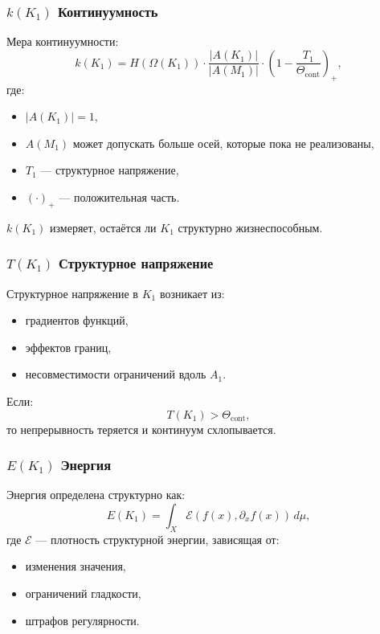 \subsubsection{\texorpdfstring{$k(K_1)$}{k(K_1)} Континуумность}

Мера континуумности:
\[
k(K_1) =
H(\Omega(K_1)) \cdot
\frac{|A(K_1)|}{|A(M_1)|} \cdot
(1 - \frac{T_1}{\Theta_{\mathrm{cont}}})_+,
\]
где:
\begin{itemize}
    \item $|A(K_1)| = 1$,
    \item $A(M_1)$ может допускать больше осей, которые пока не реализованы,
    \item $T_1$ — структурное напряжение,
    \item $(\cdot)_+$ — положительная часть.
\end{itemize}

$k(K_1)$ измеряет, остаётся ли $K_1$ структурно жизнеспособным.

\subsubsection{\texorpdfstring{$T(K_1)$}{T(K_1)} Структурное напряжение}

Структурное напряжение в $K_1$ возникает из:
\begin{itemize}
    \item градиентов функций,
    \item эффектов границ,
    \item несовместимости ограничений вдоль $A_1$.
\end{itemize}

Если:
\[
T(K_1) > \Theta_{\mathrm{cont}},
\]
то непрерывность теряется и континуум схлопывается.

\subsubsection{\texorpdfstring{$E(K_1)$}{E(K_1)} Энергия}

Энергия определена структурно как:
\[
E(K_1) = \int_X \mathcal{E}(f(x), \partial_x f(x))\, d\mu,
\]
где $\mathcal{E}$ — плотность структурной энергии, зависящая от:
\begin{itemize}
    \item изменения значения,
    \item ограничений гладкости,
    \item штрафов регулярности.
\end{itemize}

